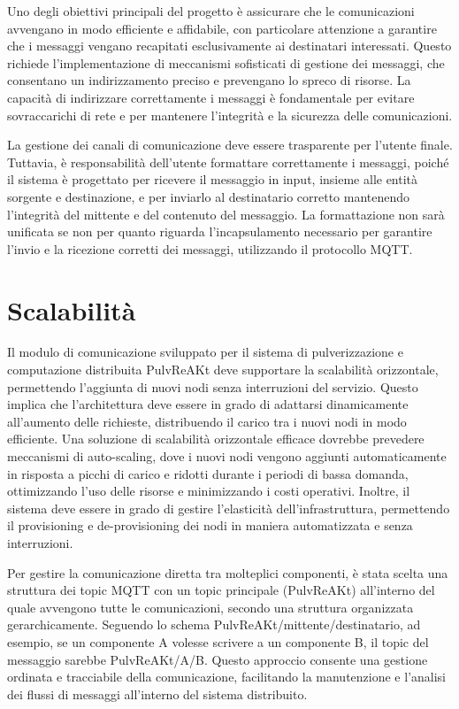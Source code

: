 \documentclass[12pt,a4paper,openright,twoside]{book}
\begin{document}
Uno degli obiettivi principali del progetto è assicurare che le comunicazioni avvengano in modo efficiente e affidabile, con particolare attenzione a garantire 
che i messaggi vengano recapitati esclusivamente ai destinatari interessati. Questo richiede l'implementazione di meccanismi sofisticati di gestione dei messaggi, 
che consentano un indirizzamento preciso e prevengano lo spreco di risorse. La capacità di indirizzare correttamente i messaggi è fondamentale per evitare 
sovraccarichi di rete e per mantenere l'integrità e la sicurezza delle comunicazioni.

La gestione dei canali di comunicazione deve essere trasparente per l'utente finale. Tuttavia, è responsabilità dell'utente formattare correttamente i messaggi, 
poiché il sistema è progettato per ricevere il messaggio in input, insieme alle entità sorgente e destinazione, e per inviarlo al destinatario corretto mantenendo 
l'integrità del mittente e del contenuto del messaggio. La formattazione non sarà unificata se non per quanto riguarda l'incapsulamento necessario per garantire l'invio e 
la ricezione corretti dei messaggi, utilizzando il protocollo \ac{MQTT}. 

\section{Scalabilità}
Il modulo di comunicazione sviluppato per il sistema di pulverizzazione e computazione distribuita PulvReAKt deve supportare la scalabilità orizzontale, permettendo l'aggiunta 
di nuovi nodi senza interruzioni del servizio. Questo implica che l'architettura deve essere in grado di adattarsi dinamicamente all'aumento delle richieste, distribuendo il carico 
tra i nuovi nodi in modo efficiente. Una soluzione di scalabilità orizzontale efficace dovrebbe prevedere meccanismi di auto-scaling, dove i nuovi nodi vengono aggiunti 
automaticamente in risposta a picchi di carico e ridotti durante i periodi di bassa domanda, ottimizzando l'uso delle risorse e minimizzando i costi operativi. Inoltre, 
il sistema deve essere in grado di gestire l'elasticità dell'infrastruttura, permettendo il provisioning e de-provisioning dei nodi in maniera automatizzata e senza interruzioni.

Per gestire la comunicazione diretta tra molteplici componenti, è stata scelta una struttura dei topic \ac{MQTT} con un topic principale (PulvReAKt) all'interno del quale avvengono 
tutte le comunicazioni, secondo una struttura organizzata gerarchicamente. Seguendo lo schema PulvReAKt/mittente/destinatario, ad esempio, se un componente A volesse scrivere a un 
componente B, il topic del messaggio sarebbe PulvReAKt/A/B. Questo approccio consente una gestione ordinata e tracciabile della comunicazione, facilitando la manutenzione e 
l'analisi dei flussi di messaggi all'interno del sistema distribuito.
\end{document}
